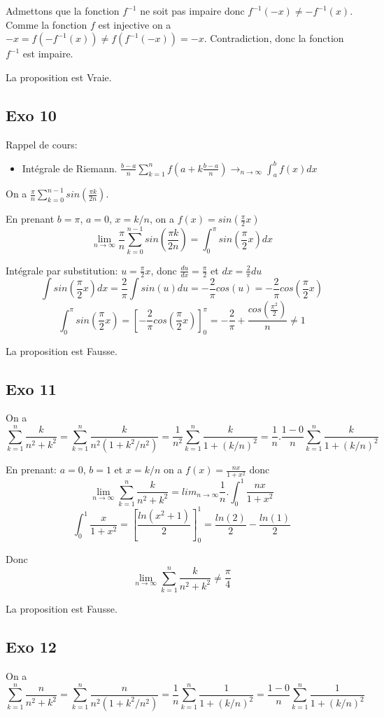 \documentclass[]{book}
\theoremstyle{definition}
\begin{document}
Admettons que la fonction $f^{-1}$ ne soit pas impaire donc $f^{-1}(-x) \neq -f^{-1}(x)$. Comme la fonction $f$ est injective on a $-x = f(-f^{-1}(x)) \neq f(f^{-1}(-x)) = -x$. Contradiction, donc la fonction $f^{-1}$ est impaire.

La proposition est Vraie.

\subsection*{Exo 10}
Rappel de cours:
\begin{itemize}
\item Int\'egrale de Riemann. $\frac{b-a}{n}\sum_{k=1}^{n}f(a+k\frac{b-a}{n}) \to_{n \to \infty} \int_{a}^{b} f(x)dx$
\end{itemize}

On a $\frac{\pi}{n}\sum_{k=0}^{n-1} sin(\frac{\pi k}{2n})$.

En prenant $b=\pi$, $a=0$, $x=k/n$, on a $f(x) = sin(\frac{\pi}{2}x)$
$$\lim_{n \to \infty}\frac{\pi}{n}\sum_{k=0}^{n-1}sin(\frac{\pi k}{2n}) = \int_0^{\pi}sin(\frac{\pi}{2}x)dx$$

Int\'egrale par substitution: $u=\frac{\pi}{2}x$, donc $\frac{du}{dx} = \frac{\pi}{2}$ et $dx=\frac{2}{\pi}du$
$$\int sin(\frac{\pi}{2}x)dx = \frac{2}{\pi}\int sin(u)du = -\frac{2}{\pi}cos(u) = -\frac{2}{\pi}cos(\frac{\pi}{2}x)$$
$$\int_0^{\pi} sin(\frac{\pi}{2}x) = [-\frac{2}{\pi}cos(\frac{\pi}{2}x)]_0^{\pi} = -\frac{2}{\pi} + \frac{cos(\frac{\pi^2}{2})}{n} \neq 1$$


La proposition est Fausse.

\subsection*{Exo 11}
On a $$\sum_{k=1}^{n}\frac{k}{n^2+k^2} = \sum_{k=1}^{n}\frac{k}{n^2(1+k^2/n^2)} = \frac{1}{n^2}\sum_{k=1}^{n}\frac{k}{1+(k/n)^2} = \frac{1}{n}.\frac{1-0}{n}\sum_{k=1}^{n}\frac{k}{1+(k/n)^2}$$

En prenant: $a=0$, $b=1$ et $x=k/n$ on a $f(x)=\frac{nx}{1+x^2}$ donc
$$\lim_{n \to \infty}\sum_{k=1}^{n}\frac{k}{n^2+k^2} = lim_{n \to \infty}\frac{1}{n}.\int_0^1 \frac{nx}{1+x^2}$$
$$\int_0^1 \frac{x}{1+x^2} = [\frac{ln(x^2+1)}{2}]_0^1 = \frac{ln(2)}{2} - \frac{ln(1)}{2}$$

Donc
$$ \lim_{n \to \infty}\sum_{k=1}^{n}\frac{k}{n^2+k^2} \neq \frac{\pi}{4}$$

La proposition est Fausse.

\subsection*{Exo 12}
On a $$\sum_{k=1}^{n}\frac{n}{n^2+k^2} = \sum_{k=1}^{n}\frac{n}{n^2(1+k^2/n^2)} = \frac{1}{n}\sum_{k=1}^{n}\frac{1}{1+(k/n)^2} = \frac{1-0}{n}\sum_{k=1}^{n}\frac{1}{1+(k/n)^2}$$
\end{document}
